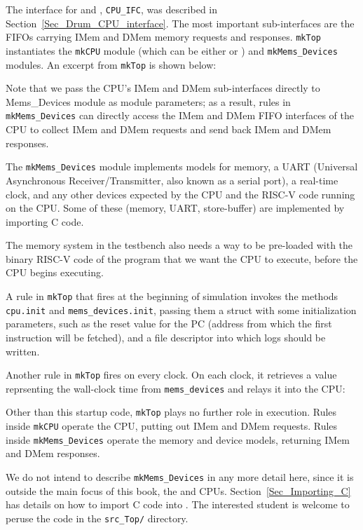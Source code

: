 The interface for {\DRUM} and {\FIFE}, \verb|CPU_IFC|, was described in
Section~\ref{Sec_Drum_CPU_interface}.  The most important
sub-interfaces are the FIFOs carrying IMem and DMem memory requests
and responses.  \verb|mkTop| instantiates the \verb|mkCPU| module
(which can be either {\DRUM} or {\FIFE}) and \verb|mkMems_Devices| modules.
An excerpt from \verb|mkTop| is shown below:


Note that we pass the CPU's IMem and DMem sub-interfaces directly to
Mems\_Devices module as module parameters; as a result, rules in
\verb|mkMems_Devices| can directly access the IMem and DMem FIFO
interfaces of the CPU to collect IMem and DMem requests and send back
IMem and DMem responses.

The \verb|mkMems_Devices| module implements models for memory, a UART
(Universal Asynchronous Receiver/Transmitter, also known as a serial
port), a real-time clock, and any other devices expected by the CPU
and the RISC-V code running on the CPU.  Some of these (memory, UART,
{\FIFE} store-buffer) are implemented by importing C code.

The memory system in the testbench also needs a way to be pre-loaded
with the binary RISC-V code of the program that we want the CPU to
execute, before the CPU begins executing.

A rule in \verb|mkTop| that fires at the beginning of simulation
invokes the methods \verb|cpu.init| and \verb|mems_devices.init|,
passing them a struct with some initialization parameters, such as the
reset value for the PC (address from which the first instruction will
be fetched), and a file descriptor into which logs should be written.


Another rule in \verb|mkTop| fires on every clock.  On each clock, it
retrieves a value reprsenting the wall-clock time from
\verb|mems_devices| and relays it into the CPU:


Other than this startup code, \verb|mkTop| plays no further role in
execution.  Rules inside \verb|mkCPU| operate the CPU, putting out
IMem and DMem requests.  Rules inside \verb|mkMems_Devices| operate
the memory and device models, returning IMem and DMem responses.

We do not intend to describe \verb|mkMems_Devices| in any more detail
here, since it is outside the main focus of this book, the {\DRUM} and
{\FIFE} CPUs.  Section~\ref{Sec_Importing_C} has details on how to import
C code into {\BSV}.  The interested student is welcome to peruse the code
in the \verb|src_Top/| directory.

